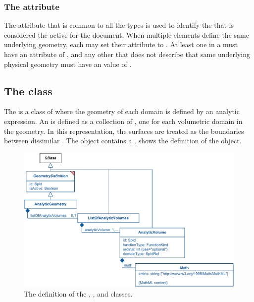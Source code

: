 \subsubsection{The \fixttspace{} attribute}
The  attribute that is common to all the \GeometryDefinition types is used to identify the \GeometryDefinition that is considered the active \GeometryDefinition for the document.  When multiple \GeometryDefinition elements define the same underlying geometry, each may set their  attribute to .  At least one \GeometryDefinition in a \Model must have an  attribute of , and any other \GeometryDefinition that does not describe that same underlying physical geometry must have an  value of .

\subsection{The  class}
\label{analyticgeometry-class}
\label{listofanalyticvolumes-class}
The \AnalyticGeometry is a class of \GeometryDefinition where the geometry of each domain is defined by an analytic expression. An \AnalyticGeometry is defined as a collection of \AnalyticVolumes, one \AnalyticVolume for each volumetric domain in the geometry. In this representation, the surfaces are treated as the boundaries between dissimilar \AnalyticVolumes. The \AnalyticGeometry object contains a \ListOfAnalyticVolumes.  shows the definition of the \AnalyticGeometry object.

\begin{figure}[ht]
  \includegraphics{figs/AnalyticGeometry-uml}
  \caption{The definition of the \AnalyticGeometry, \ListOfAnalyticVolumes, and \AnalyticVolume classes.}
  \label{AnalyticGeometry-uml}
  \label{ListOfAnalyticVolumes-uml}
  \label{AnalyticVolume-uml}
\end{figure}


